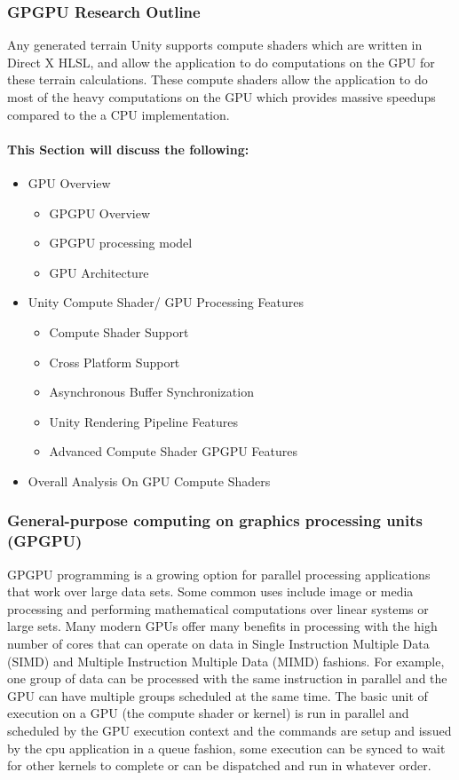 \documentclass[a4paper,10pt]{article}
\begin{document}
\subsubsection{GPGPU Research Outline}
Any generated terrain Unity supports compute shaders which are written in Direct X HLSL, and allow the application to do computations on the GPU for
these terrain calculations. These compute shaders allow the application to do most of the heavy computations on the GPU which provides massive speedups compared to the a CPU implementation.
\paragraph{This Section will discuss the following:}
\begin{itemize}
	\item GPU Overview 
	\begin{itemize}
		\item GPGPU Overview
		\item GPGPU processing model
		\item GPU Architecture
	\end{itemize}
	\item Unity Compute Shader/ GPU Processing Features
	\begin{itemize}
		\item Compute Shader Support
		\item Cross Platform Support
		\item Asynchronous Buffer Synchronization
		\item Unity Rendering Pipeline Features
		\item Advanced Compute Shader GPGPU Features
	\end{itemize}
	\item Overall Analysis On GPU Compute Shaders
\end{itemize}
\pagebreak
\subsubsection{General-purpose computing on graphics processing units (GPGPU)}
GPGPU programming is a growing option for parallel processing applications that work over large data sets. Some common uses include image or media processing and 
performing mathematical computations over linear systems or large sets. Many modern GPUs offer many benefits in processing with the high number of cores that can operate on data 
in Single Instruction Multiple Data (SIMD) and Multiple Instruction Multiple Data (MIMD) fashions. For example, one group of data can be processed with the same instruction in parallel 
and the GPU can have multiple groups scheduled at the same time. The basic unit of execution on a GPU (the compute shader or kernel) is run in parallel and scheduled by the GPU execution context
and the commands are setup and issued by the cpu application in a queue fashion, some execution can be synced to wait for other kernels to complete or can be dispatched and run in whatever order.
\end{document}
